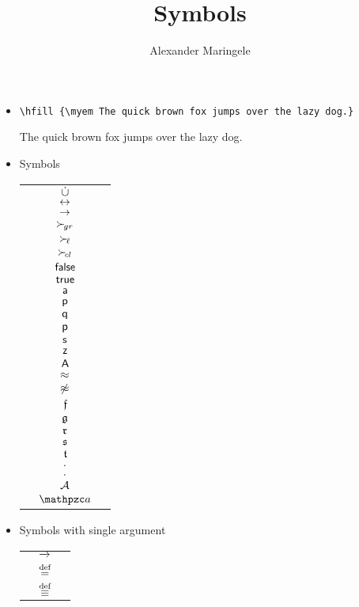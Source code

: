 \documentclass[]{clseminar}
\begin{document}
    \author{Alexander Maringele}
    \title{Symbols}

    \maketitle

    \newcommand{\showmath}[1]{\texttt{\string#1} & $#1$ & \texttt{\meaning#1}\\}

    \begin{itemize}
        \item \verb+\hfill {\myem The quick brown fox jumps over the lazy dog.} +

        \hfill {\myem The quick brown fox jumps over the lazy dog.}
        \item Symbols

        \begin{tabular}{lcl}
        \showmath{\disjointunion}
        \showmath{\lbic}
        \showmath{\limp}
        \showmath{\succG}
        \showmath{\succL}
        \showmath{\succC}
        \showmath{\false}
        \showmath{\true}
        \showmath{\ma}
        \showmath{\mpp}
        \showmath{\mpq}
        \showmath{\mpred}
        \showmath{\msucc}
        \showmath{\mzero}
        \showmath{\mA}
        \showmath{\mEQ}
        \showmath{\mNE}
        \showmath{\mkf}
        \showmath{\mkg}
        \showmath{\mkr}
        \showmath{\mks}
        \showmath{\mkt}
        \showmath{\encsep}
        \showmath{\pthsep}

        \showmath{\mcA}
        \showmath{\mca}

        \end{tabular}

        \item Symbols with single argument

        \begin{tabular}{lcl}
            \showmath{\rwStep}
            \showmath{}
            \showmath{}
        \end{tabular}

    \end{itemize}

    
\end{document}
